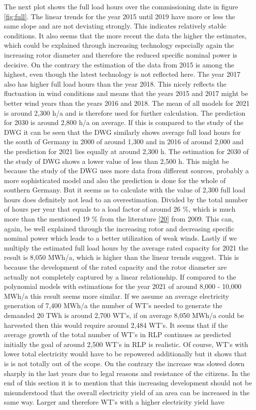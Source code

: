 \documentclass[a4paper,11pt]{article}
\begin{document}
The next plot shows the full load hours over the commissioning date in figure \ref{fig:full}. The linear trends for the year 2015 until 2019 have more or less the same slope and are not deviating strongly. This indicates relatively stable conditions. It also seems that the more recent the data the higher the estimates, which could be explained through increasing technology especially again the increasing rotor diameter and therefore the reduced specific nominal power is decisive. On the contrary the estimation of the data from 2015 is among the highest, even though the latest technology is not reflected here. The year 2017 also has higher full load hours than the year 2018. This nicely reflects the fluctuation in wind conditions and means that the years 2015 and 2017 might be better wind years than the years 2016 and 2018. The mean of all models for 2021 is around 2,300 h/a and is therefore used for further calculation. The prediction for 2030 is around 2,800 h/a on average. If this is compared to the study of the DWG it can be seen that the DWG similarly shows average full load hours for the south of Germany in 2000 of around 1,300 and in 2016 of around 2,000 and the prediction for 2021 lies equally at around 2,300 h. The estimation for 2030 of the study of DWG shows a lower value of less than 2,500 h. This might be because the study of the DWG uses more data from different sources, probably a more sophisticated model and also the prediction is done for the whole of southern Germany. But it seems as to calculate with the value of 2,300 full load hours does definitely not lead to an overestimation. Divided by the total number of hours per year that equals to a load factor of around 26 \%, which is much more than the mentioned 19 \% from the literature {[}\protect\hyperlink{ref-DavidJCMacKay.2009}{20}{]} from 2009. This can, again, be well explained through the increasing rotor and decreasing specific nominal power which leads to a better utilization of weak winds. Lastly if we multiply the estimated full load hours by the average rated capacity for 2021 the result is 8,050 MWh/a, which is higher than the linear trends suggest. This is because the development of the rated capacity and the rotor diameter are actually not completely captured by a linear relationship. If compared to the polynomial models with estimations for the year 2021 of around 8,000 - 10,000 MWh/a this result seems more similar. If we assume an average electricity generation of 7,400 MWh/a the number of WT's needed to generate the demanded 20 TWh is around 2,700 WT's, if on average 8,050 MWh/a could be harvested then this would require around 2,484 WT's. It seems that if the average growth of the total number of WT's in RLP continues as predicted initially the goal of around 2,500 WT's in RLP is realistic. Of course, WT's with lower total electricity would have to be repowered additionally but it shows that is is not totally out of the scope. On the contrary the increase was slowed down sharply in the last years due to legal reasons and resistance of the citizens. In the end of this section it is to mention that this increasing development should not be misunderstood that the overall electricity yield of an area can be increased in the same way. Larger and therefore WT's with a higher electricity yield have 
\end{document}
